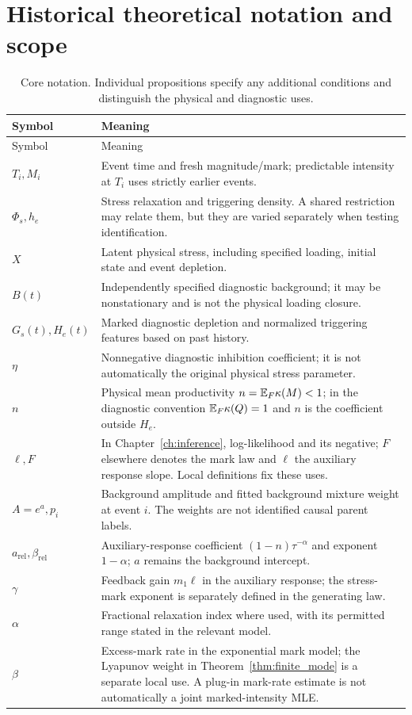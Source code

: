 \section{Historical theoretical notation and scope}
\label{app:notation}

\begin{longtable}{@{}p{}p{}@{}}
\caption{Core notation. Individual propositions specify any additional conditions and distinguish the physical and diagnostic uses.}\\
\toprule Symbol & Meaning \\
\midrule\endfirsthead
\toprule Symbol & Meaning \\\midrule\endhead
$T_i,M_i$ & Event time and fresh magnitude/mark; predictable intensity at $T_i$ uses strictly earlier events. \\
$\Phi_s,h_e$ & Stress relaxation and triggering density. A shared restriction may relate them, but they are varied separately when testing identification. \\
$X$ & Latent physical stress, including specified loading, initial state and event depletion. \\
$B(t)$ & Independently specified diagnostic background; it may be nonstationary and is not the physical loading closure. \\
$G_s(t),H_e(t)$ & Marked diagnostic depletion and normalized triggering features based on past history. \\
$\eta$ & Nonnegative diagnostic inhibition coefficient; it is not automatically the original physical stress parameter. \\
$n$ & Physical mean productivity $n=\mathbb{E} _F\kappa(M)<1$; in the diagnostic convention $\mathbb{E} _F\kappa(Q)=1$ and $n$ is the coefficient outside $H_e$. \\
$\ell,F$ & In Chapter~\ref{ch:inference}, log-likelihood and its negative; $F$ elsewhere denotes the mark law and $\ell$ the auxiliary response slope. Local definitions fix these uses. \\
$A=e^a,p_i$ & Background amplitude and fitted background mixture weight at event $i$. The weights are not identified causal parent labels. \\
$a_{\mathrm{rel}},\beta_{\mathrm{rel}}$ & Auxiliary-response coefficient $(1-n)\tau^{-\alpha}$ and exponent $1-\alpha$; $a$ remains the background intercept. \\
$\gamma$ & Feedback gain $m_1\ell$ in the auxiliary response; the stress-mark exponent is separately defined in the generating law. \\
$\alpha$ & Fractional relaxation index where used, with its permitted range stated in the relevant model. \\
$\beta$ & Excess-mark rate in the exponential mark model; the Lyapunov weight in Theorem~\ref{thm:finite_mode} is a separate local use. A plug-in mark-rate estimate is not automatically a joint marked-intensity MLE. \\
\bottomrule
\end{longtable}

